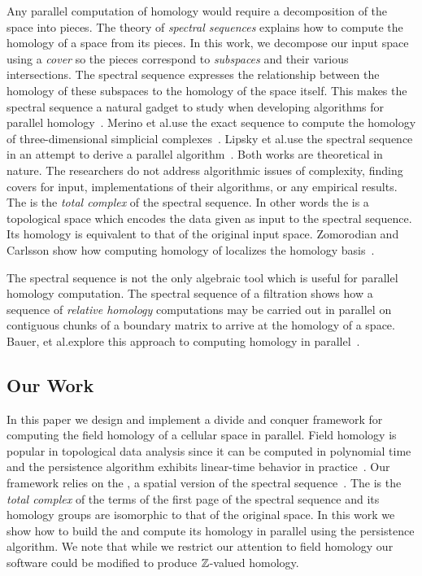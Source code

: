 \documentclass{elsarticle}
\begin{document}
Any parallel computation of homology would require a decomposition of the
space into pieces.  The theory of \emph{spectral sequences} explains how to 
compute the homology of a space from its pieces. In this work, we decompose 
our input space using a \emph{cover} so the pieces correspond to \emph{subspaces} and their various intersections. 
The \mv spectral sequence expresses the relationship between the homology of these subspaces to the homology of the space itself.
This makes the \mv spectral sequence a natural gadget to study when developing algorithms for parallel homology~\cite{hatcher}. 
Merino et al.\@ use the \mv exact sequence to compute the homology of
three-dimensional simplicial complexes~\cite{bmlf-cmv-10}.  
Lipsky et al.\@ use the \mv spectral sequence in an attempt to derive a parallel algorithm~\cite{lsv-ss-11}.
Both works are theoretical in nature. The researchers do not address algorithmic issues of complexity, finding
covers for input, implementations of their algorithms, or any empirical results. 
The \mvb{} is the \emph{total complex} of the \mv spectral sequence. In other words the \mvb{} is a topological space which
encodes the data given as input to the spectral sequence. Its homology is equivalent to that of the original input space. 
Zomorodian and Carlsson show how computing homology of \mvb{} localizes the homology basis~\cite{zc-lh-08}.   

The \mv spectral sequence is not the only algebraic tool which is useful for parallel homology computation.
The spectral sequence of a filtration shows how a sequence of \emph{relative homology} computations may be carried out
in parallel on contiguous chunks of a boundary matrix to arrive at the homology of a space. 
Bauer, et al.\@ explore this approach to computing homology in parallel~\cite{bkr-cccph-13}. 

\subsection{Our Work}
In this paper we design and implement a divide and conquer framework for computing the field 
homology of a cellular space in parallel. Field homology is popular in 
topological data analysis since it can be computed in polynomial time and the persistence
algorithm exhibits linear-time behavior in practice~\cite{elz-tps-02,zc-cph-05}. 
Our framework relies on the \mvb{}, a spatial version of the \mv spectral sequence~\cite{zc-lh-08}. 
The \mvb{} is the \emph{total complex} of the terms of the first page of the 
\mv spectral sequence and its homology groups are isomorphic to that of the original space. 
In this work we show how to build the \mvb{} and compute its homology in parallel using the persistence algorithm. 
We note that while we restrict our attention to field homology our software could be modified to produce $\mathbb{Z}$-valued homology.
\end{document}
